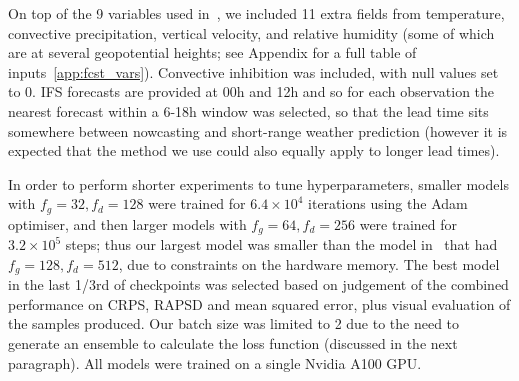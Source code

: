 \documentclass{article}
\begin{document}
 On top of the 9 variables used in~\cite{harris_generative_2022}, we included 11 extra fields from temperature, convective precipitation, vertical velocity, and relative humidity (some of which are at several geopotential heights; see Appendix for a full table of inputs~\ref{app:fcst_vars}). Convective inhibition was included, with null values set to 0. IFS forecasts are provided at 00h and 12h and so for each observation the nearest forecast within a 6-18h window was selected, so that the lead time sits somewhere between nowcasting and short-range weather prediction (however it is expected that the method we use could also equally apply to longer lead times).

 In order to perform shorter experiments to tune hyperparameters, smaller models with $f_g=32, f_d=128$ were trained for $6.4\times 10^4$ iterations using the Adam optimiser, and then larger models with $f_g=64, f_d=256$ were trained for $3.2\times10^5$ steps; thus our largest model was smaller than the model in~\cite{harris_generative_2022} that had $f_g=128, f_d=512$, due to constraints on the hardware memory. The best model in the last 1/3rd of checkpoints was selected based on judgement of the combined performance on CRPS, RAPSD and mean squared error, plus visual evaluation of the samples produced. Our batch size was limited to 2 due to the need to generate an ensemble to calculate the loss function (discussed in the next paragraph). All models were trained on a single Nvidia A100 GPU.

\end{document}
